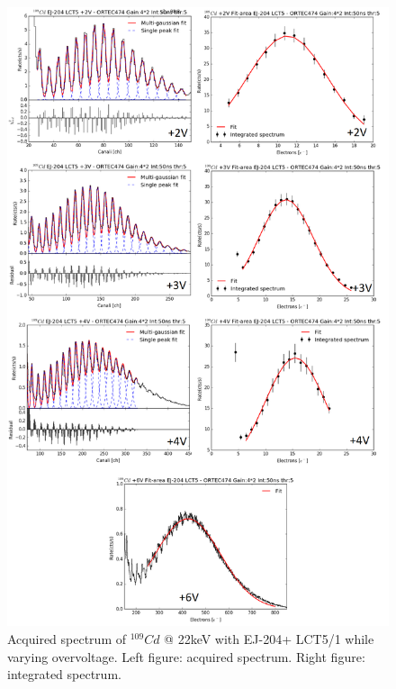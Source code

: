 \documentclass[10pt,a4paper, openany]{book}
\begin{document}
\begin{figure}[!h]
\begin{center}
\includegraphics[scale=0.35]{imm/ej_204_fit.png}
\end{center}
\caption{Acquired spectrum of $^{109}Cd$ @ 22keV with EJ-204+ LCT5/1 while varying overvoltage. Left figure: acquired spectrum. Right figure: integrated spectrum.} 
\label{fig:ej204_fit}
\end{figure}
\end{document}
